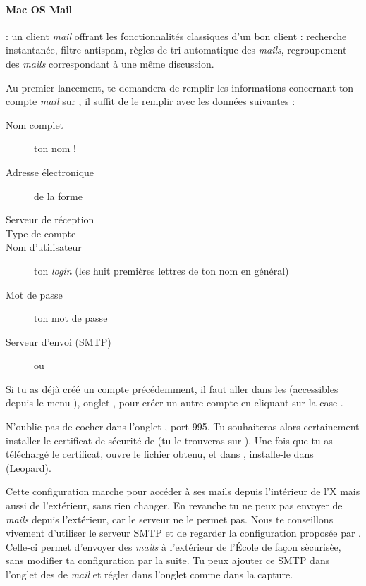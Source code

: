 \paragraph{Mac OS Mail}

  : un client \emph{mail} offrant les fonctionnalit\'es classiques d'un bon client : recherche instantan\'ee, filtre antispam, r\`egles de tri automatique des \emph{mails}, regroupement des \emph{mails} correspondant \`a  une m\^eme discussion.

Au premier lancement,  te demandera de remplir les informations concernant ton compte \emph{mail} sur , il suffit de le remplir avec les donn\'ees suivantes :
\begin{description}
  \item[Nom complet] ton nom !
  \item[Adresse \'electronique] de la forme 
  \item[Serveur de r\'eception] 
  \item[Type de compte] 
  \item[Nom d'utilisateur] ton \emph{login}  (les huit premi\`eres lettres de ton nom en g\'en\'eral)
  \item[Mot de passe] ton mot de passe 
  \item[Serveur d'envoi (SMTP)]  ou 
\end{description}

Si tu as d\'ej\`a  cr\'e\'e un compte pr\'ec\'edemment, il faut aller dans les  (accessibles depuis le menu ), onglet , pour cr\'eer un autre compte en cliquant sur la case \menu{+}.

N'oublie pas de cocher  dans l'onglet , port 995. Tu souhaiteras alors certainement installer le certificat de s\'ecurit\'e de  (tu le trouveras sur ). Une fois que tu as t\'el\'echarg\'e le certificat, ouvre le fichier  obtenu, et dans , installe-le dans %
 (Leopard).

Cette configuration marche pour acc\'eder \`a  ses mails depuis l'int\'erieur de l'X mais aussi de l'ext\'erieur, sans rien changer.
En revanche tu ne peux pas envoyer de \emph{mails} depuis l'ext\'erieur, car le serveur  ne le permet pas.
Nous te conseillons vivement d'utiliser le serveur SMTP  et de regarder la configuration propos\'ee par .
Celle-ci permet d'envoyer des \emph{mails} \`a  l'ext\'erieur de l'\'Ecole de façon s\`ecuris\`ee, sans modifier ta configuration par la suite.
Tu peux ajouter ce SMTP dans l'onglet  des  de \emph{mail} et r\'egler dans l'onglet  comme dans la capture.

